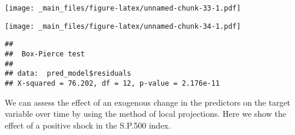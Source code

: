 \documentclass[
]{book}
\newenvironment{Shaded}{\begin{snugshade}}{\end{snugshade}}
\newcommand{\AttributeTok}[1]{\textcolor[rgb]{0.13,0.29,0.53}{#1}}
\newcommand{\CommentTok}[1]{\textcolor[rgb]{0.56,0.35,0.01}{\textit{#1}}}
\newcommand{\DecValTok}[1]{\textcolor[rgb]{0.00,0.00,0.81}{#1}}
\newcommand{\FunctionTok}[1]{\textcolor[rgb]{0.13,0.29,0.53}{\textbf{#1}}}
\newcommand{\NormalTok}[1]{#1}
\newcommand{\SpecialCharTok}[1]{\textcolor[rgb]{0.81,0.36,0.00}{\textbf{#1}}}
\begin{document}
\texttt{[image: \_main\_files/figure-latex/unnamed-chunk-33-1.pdf]}

\begin{Shaded}
\end{Shaded}

\texttt{[image: \_main\_files/figure-latex/unnamed-chunk-34-1.pdf]}

\begin{Shaded}
\end{Shaded}

\begin{verbatim}
## 
##  Box-Pierce test
## 
## data:  pred_model$residuals
## X-squared = 76.202, df = 12, p-value = 2.176e-11
\end{verbatim}

We can assess the effect of an exogenous change in the predictors on the target variable over time by using the method of local projections. Here we show the effect of a positive shock in the S.P.500 index.
\end{document}
